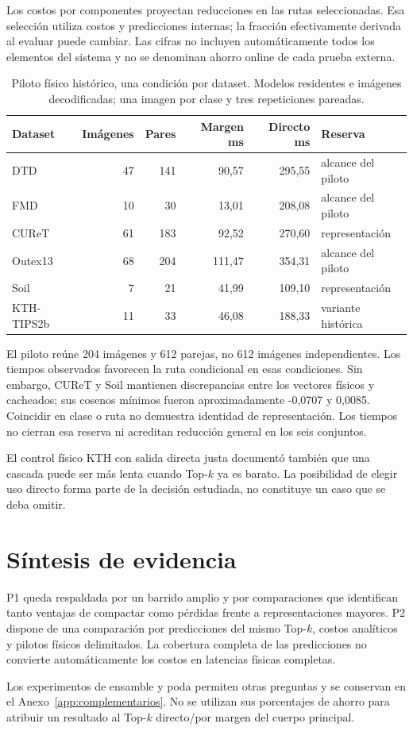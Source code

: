 Los costos por componentes proyectan reducciones en las rutas seleccionadas. Esa selección utiliza costos y predicciones internas; la fracción efectivamente derivada al evaluar puede cambiar. Las cifras no incluyen automáticamente todos los elementos del sistema y no se denominan ahorro online de cada prueba externa.

\begin{table}[!htbp]\centering\fontsize{8}{10}\selectfont
\caption{Piloto físico histórico, una condición por dataset. Modelos residentes e imágenes decodificadas; una imagen por clase y tres repeticiones pareadas.}
\label{tab:gpu-benchmark}
\begin{tabular}{@{}lrrrrl@{}}\toprule
Dataset & Imágenes & Pares & Margen ms & Directo ms & Reserva\\\midrule
DTD & 47 & 141 & 90,57 & 295,55 & alcance del piloto\\
FMD & 10 & 30 & 13,01 & 208,08 & alcance del piloto\\
CUReT & 61 & 183 & 92,52 & 270,60 & representación\\
Outex13 & 68 & 204 & 111,47 & 354,31 & alcance del piloto\\
Soil & 7 & 21 & 41,99 & 109,10 & representación\\
KTH-TIPS2b & 11 & 33 & 46,08 & 188,33 & variante histórica\\
\bottomrule\end{tabular}
\end{table}

El piloto reúne 204 imágenes y 612 parejas, no 612 imágenes independientes. Los tiempos observados favorecen la ruta condicional en esas condiciones. Sin embargo, CUReT y Soil mantienen discrepancias entre los vectores físicos y cacheados; sus cosenos mínimos fueron aproximadamente -0,0707 y 0,0085. Coincidir en clase o ruta no demuestra identidad de representación. Los tiempos no cierran esa reserva ni acreditan reducción general en los seis conjuntos.

El control físico KTH con salida directa justa documentó también que una cascada puede ser más lenta cuando Top-\(k\) ya es barato. La posibilidad de elegir uso directo forma parte de la decisión estudiada, no constituye un caso que se deba omitir.

\section{Síntesis de evidencia}
P1 queda respaldada por un barrido amplio y por comparaciones que identifican tanto ventajas de compactar como pérdidas frente a representaciones mayores. P2 dispone de una comparación por predicciones del mismo Top-\(k\), costos analíticos y pilotos físicos delimitados. La cobertura completa de las predicciones no convierte automáticamente los costos en latencias físicas completas.

Los experimentos de ensamble y poda permiten otras preguntas y se conservan en el Anexo~\ref{app:complementarios}. No se utilizan sus porcentajes de ahorro para atribuir un resultado al Top-\(k\) directo/por margen del cuerpo principal.

